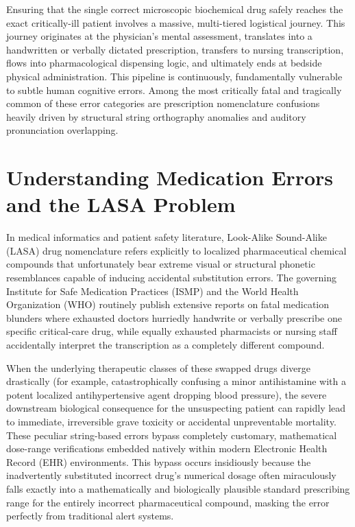 \documentclass[12pt,a4paper]{report}
\begin{document}
Ensuring that the single correct microscopic biochemical drug safely reaches the exact critically-ill patient involves a massive, multi-tiered logistical journey. This journey originates at the physician's mental assessment, translates into a handwritten or verbally dictated prescription, transfers to nursing transcription, flows into pharmacological dispensing logic, and ultimately ends at bedside physical administration. This pipeline is continuously, fundamentally vulnerable to subtle human cognitive errors. Among the most critically fatal and tragically common of these error categories are prescription nomenclature confusions heavily driven by structural string orthography anomalies and auditory pronunciation overlapping.

\section{Understanding Medication Errors and the LASA Problem}
In medical informatics and patient safety literature, Look-Alike Sound-Alike (LASA) drug nomenclature refers explicitly to localized pharmaceutical chemical compounds that unfortunately bear extreme visual or structural phonetic resemblances capable of inducing accidental substitution errors. The governing Institute for Safe Medication Practices (ISMP) and the World Health Organization (WHO) routinely publish extensive reports on fatal medication blunders where exhausted doctors hurriedly handwrite or verbally prescribe one specific critical-care drug, while equally exhausted pharmacists or nursing staff accidentally interpret the transcription as a completely different compound.

When the underlying therapeutic classes of these swapped drugs diverge drastically (for example, catastrophically confusing a minor antihistamine with a potent localized antihypertensive agent dropping blood pressure), the severe downstream biological consequence for the unsuspecting patient can rapidly lead to immediate, irreversible grave toxicity or accidental unpreventable mortality. These peculiar string-based errors bypass completely customary, mathematical dose-range verifications embedded natively within modern Electronic Health Record (EHR) environments. This bypass occurs insidiously because the inadvertently substituted incorrect drug's numerical dosage often miraculously falls exactly into a mathematically and biologically plausible standard prescribing range for the entirely incorrect pharmaceutical compound, masking the error perfectly from traditional alert systems.
\end{document}
